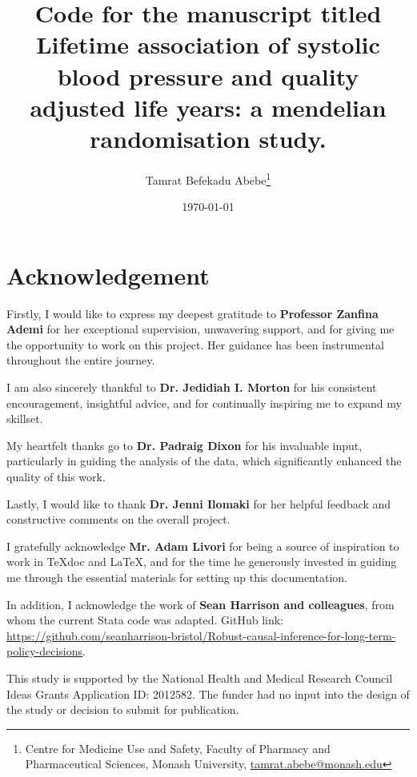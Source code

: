 \documentclass[11pt]{article}
\begin{document}
\title{Code for the manuscript titled Lifetime association of systolic blood pressure and quality adjusted life years: a mendelian randomisation study.}
\author{Tamrat Befekadu Abebe\thanks{Centre for Medicine Use and Safety, Faculty of Pharmacy and Pharmaceutical Sciences, Monash University, \href{mailto:tamrat.abebe@monash.edu}{tamrat.abebe@monash.edu}}}
\date{\today}

\maketitle
\newpage %

\tableofcontents
\newpage %

\section{Acknowledgement}

Firstly, I would like to express my deepest gratitude to \textbf{Professor Zanfina Ademi} for her exceptional supervision, unwavering support, and for giving me the opportunity to work on this project. Her guidance has been instrumental throughout the entire journey.

I am also sincerely thankful to \textbf{Dr. Jedidiah I. Morton} for his consistent encouragement, insightful advice, and for continually inspiring me to expand my skillset.

My heartfelt thanks go to \textbf{Dr. Padraig Dixon} for his invaluable input, particularly in guiding the analysis of the data, which significantly enhanced the quality of this work.

Lastly, I would like to thank \textbf{Dr. Jenni Ilomaki} for her helpful feedback and constructive comments on the overall project.

I gratefully acknowledge \textbf{Mr. Adam Livori} for being a source of inspiration to work in TeXdoc and LaTeX, and for the time he generously invested in guiding me through the essential materials for setting up this documentation.

In addition, I acknowledge the work of \textbf{Sean Harrison and colleagues}\cite{harrison2021long}, from whom the current Stata code was adapted. GitHub link: \color{blue}\url{https://github.com/seanharrison-bristol/Robust-causal-inference-for-long-term-policy-decisions}.\color{black}

This study is supported by the National Health and Medical Research Council Ideas Grants Application ID: 2012582. The funder had no input into the design of the study or decision to submit for publication.
\color{black}
\newpage
\end{document}
